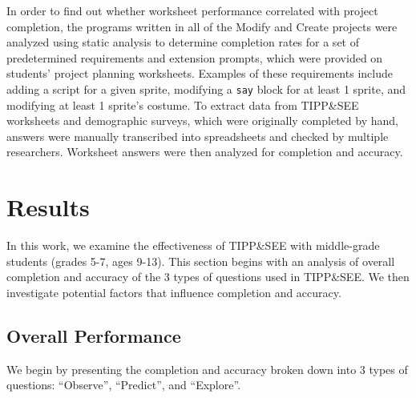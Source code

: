 \documentclass[sigconf,manuscript,review,anonymous]{acmart} %
\def\ts{TIPP\&SEE}
\begin{document}


In order to find out whether worksheet performance correlated with project completion, the programs written in all of the Modify and Create projects were analyzed using static analysis to determine completion rates for a set of predetermined requirements and extension prompts, which were provided on students' project planning worksheets. Examples of these requirements include adding a script for a given sprite, modifying a \texttt{say} block for at least 1 sprite, and modifying at least 1 sprite's costume. To extract data from \ts{} worksheets and demographic surveys, which were originally completed by hand, answers were manually transcribed into spreadsheets and checked by multiple researchers. Worksheet answers were then analyzed for completion and accuracy. %


\section{Results}

In this work, we examine the effectiveness of \ts{} with middle-grade students (grades 5-7, ages 9-13). This section begins with an analysis of overall completion and accuracy of the 3 types of questions used in \ts{}. We then investigate potential factors that influence completion and accuracy. %

\subsection{Overall Performance}
We begin by presenting the completion and accuracy broken down into 3 types of questions: ``Observe'', ``Predict'', and ``Explore''.
\end{document}
